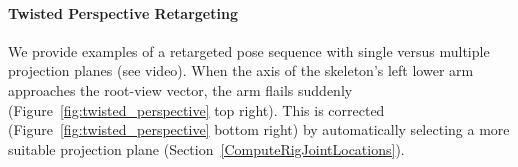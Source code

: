 






\begin{comment}
- User study assessing comprehensibility of orientation
    - 10 characters
    - 10 clips with character
    - 10 clips with 3D model
\end{comment}

\begin{comment}
   - User study assessing appeal vs. 3D and vs. flat cardboard character.
    - 3 characters
    - A B C side-by-side comparison 
\end{comment}

\paragraph{Twisted Perspective Retargeting}
We provide examples of a retargeted pose sequence with single versus multiple projection planes (see video).
When the axis of the skeleton's left lower arm approaches the root-view vector, the arm flails suddenly (Figure~\ref{fig:twisted_perspective} top right). 
This is corrected (Figure~\ref{fig:twisted_perspective} bottom right) by automatically selecting a more suitable projection plane (Section~\ref{ComputeRigJointLocations}).

